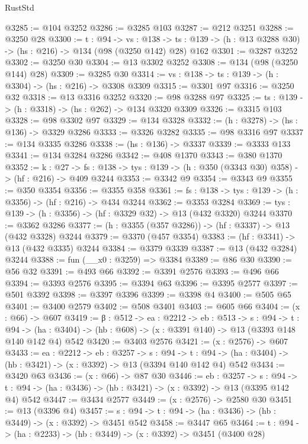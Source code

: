 \begin{lexlean}{RustStd}
\begin{coremodule}
@3285 := @104 @3252
@3286 := @3285 @103
@3287 := @212 @3251
@3288 := @3250 @28
@3300 := {t : @94} ->
  {vs : @138} ->
  {ts : @139} -> (h : @13 @3288 @30) -> (hs : @216) -> @134 (@98 (@3250 @142) @28) @162
@3301 := @3287 @3252
@3302 := @3250 @30
@3304 := @13 @3302 @3252
@3308 := @134 (@98 (@3250 @144) @28)
@3309 := @3285 @30
@3314 := {vs : @138} -> {ts : @139} -> (h : @3304) -> (hs : @216) -> @3308 @3309
@3315 := @3301 @97
@3316 := @3250 @32
@3318 := @13 @3316 @3252
@3320 := @98 @3288 @97
@3325 := {ts : @139} -> (h : @3318) -> (hs : @262) -> @134 @3320 @3309
@3326 := @3315 @103
@3328 := @98 @3302 @97
@3329 := @134 @3328
@3332 := (h : @3278) -> (hs : @136) -> @3329 @3286
@3333 := @3326 @3282
@3335 := @98 @3316 @97
@3337 := @134 @3335 @3286
@3338 := (hs : @136) -> @3337
@3339 := @3333 @133
@3341 := @134 @3284 @3286
@3342 := @408 @1370
@3343 := @380 @1370
@3352 := {k : @27} ->
  {fs : @138} -> {tys : @139} -> (h : @350 (@3343 @30) @358) -> (hf : @216) -> @409 @3244
@3353 := @3342 @9
@3354 := @3343 @9
@3355 := @350 @3354
@3356 := @3355 @358
@3361 := {fs : @138} -> {tys : @139} -> (h : @3356) -> (hf : @216) -> @434 @3244
@3362 := @3353 @3284
@3369 := {tys : @139} -> (h : @3356) -> (hf : @3329 @32) -> @13 (@432 @3320) @3244
@3370 := @3362 @3286
@3377 := (h : @3355 (@357 @3286)) -> (hf : @3337) -> @13 (@432 @3328) @3244
@3379 := @3370 (@457 @3354)
@3383 := (hf : @3341) -> @13 (@432 @3335) @3244
@3384 := @3379 @3339
@3387 := @13 (@432 @3284) @3244
@3388 := fun (__x0 : @3259) => @3384
@3389 := @86 @30
@3390 := @56 @32
@3391 := @493 @66
@3392 := @3391 @2576
@3393 := @496 @66
@3394 := @3393 @2576
@3395 := @3394 @63
@3396 := @3395 @2577
@3397 := @501 @3392
@3398 := @3397 @3396
@3399 := @3398 @4
@3400 := @505 @65
@3401 := @3400 @2579
@3402 := @508 @3401
@3403 := @605 @66
@3404 := (x : @66) -> @607
@3419 := {β : @512} ->
  {ea : @2212} ->
  {eb : @513} ->
  {s : @94} ->
  {t : @94} -> (ha : @3404) -> (hb : @608) -> (x : @3391 @140) -> @13 (@3393 @148 @140 @142 @4) @542
@3420 := @3403 @2576
@3421 := (x : @2576) -> @607
@3433 := {ea : @2212} ->
  {eb : @3257} ->
  {s : @94} ->
  {t : @94} -> (ha : @3404) -> (hb : @3421) -> (x : @3392) -> @13 (@3394 @140 @142 @4) @542
@3434 := @3420 @63
@3436 := (x : @66) -> @87 @30
@3446 := {eb : @3257} ->
  {s : @94} -> {t : @94} -> (ha : @3436) -> (hb : @3421) -> (x : @3392) -> @13 (@3395 @142 @4) @542
@3447 := @3434 @2577
@3449 := (x : @2576) -> @2580 @30
@3451 := @13 (@3396 @4)
@3457 := {s : @94} -> {t : @94} -> (ha : @3436) -> (hb : @3449) -> (x : @3392) -> @3451 @542
@3458 := @3447 @65
@3464 := {t : @94} -> (ha : @2233) -> (hb : @3449) -> (x : @3392) -> @3451 (@3400 @28)

\end{coremodule}
\end{lexlean}
